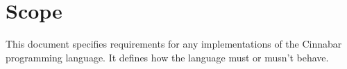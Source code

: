 
\chapter{Scope}

\para This document specifies requirements for any implementations of the Cinnabar programming language. It defines how the language must or musn't behave.

